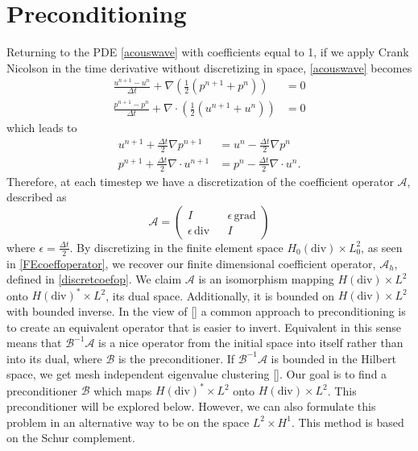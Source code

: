 \documentclass[11pt]{article}
\newcommand{\divv}{\mathrm{div}}
\newcommand{\gradd}{\mathrm{grad}}
\begin{document}
\section{Preconditioning}
Returning to the PDE \eqref{acouswave} with coefficients equal to 1, if we apply Crank Nicolson in the time derivative without discretizing in space, \eqref{acouswave} becomes
\begin{equation}
\begin{split}
\frac{u^{n+1}-u^n}{\Delta t} + \nabla \left( \frac{1}{2}\left( p^{n+1} + p^n \right) \right) &= 0\\
\frac{p^{n+1} -p^n}{\Delta t} + \nabla \cdot \left( \frac{1}{2} \left( u^{n+1}+u^n \right)\right) &=0
\end{split}
\end{equation}
which leads to
\begin{equation}
\begin{split}
u^{n+1} + \frac{\Delta t}{2}\nabla p^{n+1} &= u^n - \frac{\Delta t}{2}\nabla p^n\\
p^{n+1} + \frac{\Delta t}{2}\nabla \cdot u^{n+1} &= p^n - \frac{\Delta t}{2}\nabla \cdot u^n.
\end{split}
\end{equation}
Therefore, at each timestep we have a discretization of the coefficient operator $\mathscr{A}$, described as
\begin{equation}
\mathscr{A} = \begin{pmatrix}
I && \epsilon\,\gradd \\
\epsilon\,\divv && I
\end{pmatrix}
\end{equation} %
where $\epsilon = \frac{\Delta t}{2}$.  By discretizing in the finite element space $H_0(\divv) \times L_0^2$, as seen in \eqref{FEcoeffoperator}, we recover our finite dimensional coefficient operator, $\mathscr{A}_h$, defined in \eqref{discretcoefop}.
We claim $\mathscr{A}$ is an isomorphism mapping  $H(\divv) \times L^2$ onto $H(\divv)^*\times L^2$, its dual space. Additionally, it is bounded on $H(\divv) \times L^2$ with bounded inverse. In the view of [] a common approach to preconditioning is to create an equivalent operator that is easier to invert. Equivalent in this sense means that $\mathscr{B}^{-1}\mathscr{A}$ is a nice operator from the initial space into itself rather than into its dual, where $\mathscr{B}$ is the preconditioner. If $\mathscr{B}^{-1}\mathscr{A}$ is bounded in the Hilbert space, we get mesh independent eigenvalue clustering []. Our goal is to find a preconditioner $\mathscr{B}$ which maps $H(\divv)^* \times L^2$ onto $H(\divv) \times L^2$. This preconditioner will be explored below. However, we can also formulate this problem in an alternative way to be on the space $L^2 \times H^1$. This method is based on the Schur complement.
\end{document}
